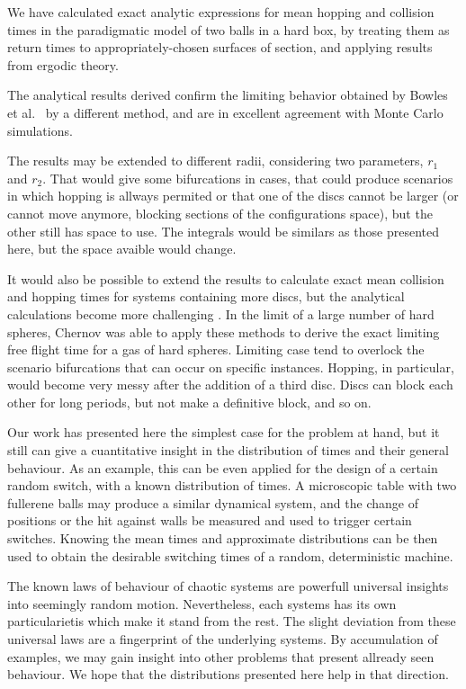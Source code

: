 \documentclass[superscriptaddress,pre,reprint,showpacs,twocolumn]{revtex4-1}
\newcommand{\etal}{et al.\ }
\begin{document}
We have calculated exact analytic expressions for mean hopping and
collision times in the paradigmatic model of two balls in a hard box,
by treating them as return times to  appropriately-chosen surfaces of section, 
and applying results from ergodic theory.

The analytical results derived 
confirm the limiting behavior obtained
by Bowles \etal \cite{Bowles04} by a different method,
and are in excellent agreement with Monte Carlo simulations.

The results may be extended to different radii, considering two parameters,
$r_1$ and $r_2$. That would give some bifurcations in cases, that could
produce scenarios in which hopping is allways permited or that one of the
discs cannot be larger (or cannot move anymore,
blocking sections of the configurations space), but the other still has space to use.
The integrals would be similars as those presented here, but the space avaible
would change. 

It would also be possible to extend the results to calculate exact mean collision
and hopping times for systems containing more discs,
but the analytical calculations become more challenging \cite{three_hard_discs_2004}.
In the limit of a large number of hard spheres, Chernov \cite{Chernov97}
was able to apply these methods to derive the exact limiting  free flight time for a gas of hard spheres. Limiting case tend to overlock the scenario bifurcations that
can occur on specific instances. Hopping, in particular, would become very
messy after the addition of a third disc. Discs can block each other for long periods,
but not make a definitive block, and so on.

Our work has presented here the simplest case for the problem at hand, but it still
can give a cuantitative insight in the distribution of times and their
general behaviour. As an example, this can be even applied for the design of a certain
random switch, with a known distribution of times. A microscopic table with two
fullerene balls may produce a similar dynamical system, and the change of positions
or the hit against walls be measured and used to trigger certain switches. 
Knowing the mean times and approximate distributions can be then used
to obtain the desirable switching times of a random, deterministic machine.

The known laws of behaviour of chaotic systems are powerfull universal insights
into seemingly random motion. Nevertheless, each systems has its own
particularietis which make it stand from the rest. The slight deviation from
these universal laws are a fingerprint of the underlying systems. By
accumulation of examples, we may gain insight into other problems that
present allready seen behaviour. We hope that the distributions presented here
help in that direction. 
\end{document}
